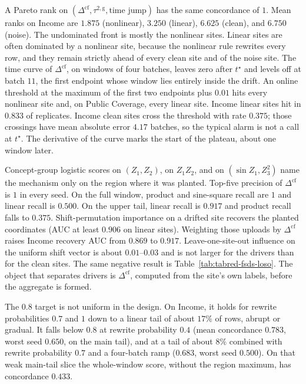 A Pareto rank on \((\Delta^{\mathrm{cf}},\tau^{2,\mathrm{g}},\text{time jump})\)
has the same concordance of \(1\).
Mean ranks on Income are \(1.875\) (nonlinear), \(3.250\) (linear),
\(6.625\) (clean), and \(6.750\) (noise).
The undominated front is mostly the nonlinear sites.
Linear sites are often dominated by a nonlinear site, because the
nonlinear rule rewrites every row, and they remain strictly ahead of every
clean site and of the noise site.
The time curve of \(\Delta^{\mathrm{cf}}\), on windows of four batches,
leaves zero after \(t^{\star}\) and levels off at batch \(11\), the first
endpoint whose window lies entirely inside the drift.
An online threshold at the maximum of the first two endpoints plus \(0.01\)
hits every nonlinear site and, on Public Coverage, every linear site.
Income linear sites hit in \(0.833\) of replicates.
Income clean sites cross the threshold with rate \(0.375\); those crossings
have mean absolute error \(4.17\) batches, so the typical alarm is not a
call at \(t^{\star}\).
The derivative of the curve marks the start of the plateau, about one
window later.

Concept-group logistic scores on \((Z_1,Z_2)\), on \(Z_1 Z_2\), and on
\((\sin Z_1, Z_3^2)\) name the mechanism only on the region where it was
planted.
Top-five precision of \(\Delta^{\mathrm{cf}}\) is \(1\) in every seed.
On the full window, product and sine-square recall are \(1\) and linear
recall is \(0.500\).
On the upper tail, linear recall is \(0.917\) and product recall falls to
\(0.375\).
Shift-permutation importance on a drifted site recovers the planted
coordinates (AUC at least \(0.906\) on linear sites).
Weighting those uploads by \(\Delta^{\mathrm{cf}}\) raises Income recovery
AUC from \(0.869\) to \(0.917\).
Leave-one-site-out influence on the uniform shift vector is about
\(0.01\)--\(0.03\) and is not larger for the drivers than for the clean
sites.
The same negative result is Table~\ref{tab:tabred-fsds-loso}.
The object that separates drivers is \(\Delta^{\mathrm{cf}}\), computed
from the site's own labels, before the aggregate is formed.

The \(0.8\) target is not uniform in the design.
On Income, it holds for rewrite probabilities \(0.7\) and \(1\) down to a
linear tail of about \(17\%\) of rows, abrupt or gradual.
It falls below \(0.8\) at rewrite probability \(0.4\) (mean concordance
\(0.783\), worst seed \(0.650\), on the main tail), and at a tail of about
\(8\%\) combined with rewrite probability \(0.7\) and a four-batch ramp
(\(0.683\), worst seed \(0.500\)).
On that weak main-tail slice the whole-window score, without the region
maximum, has concordance \(0.433\).

